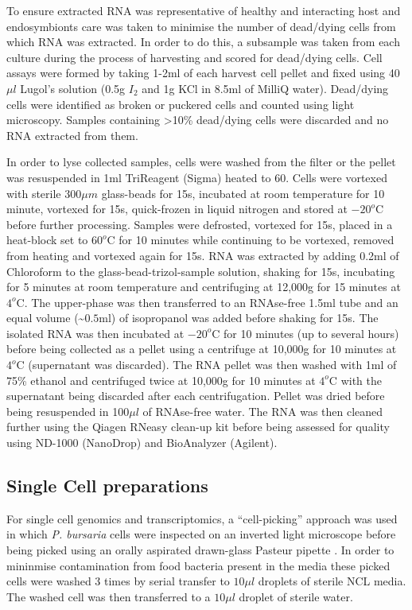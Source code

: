 To ensure extracted RNA was representative of healthy and interacting host 
and endosymbionts care was taken to minimise the number of dead/dying cells 
from which RNA was extracted.  In order to do this, a subsample was taken 
from each culture during the process of harvesting and scored for dead/dying cells.  
Cell assays were formed by taking 1-2ml of each harvest cell pellet and 
fixed using 40\(\mu l\) Lugol's solution (0.5g \(I_{2}\) and 1g KCl in 8.5ml 
of MilliQ water). Dead/dying cells were identified as broken or puckered cells 
and counted using light microscopy.  Samples containing >10\% dead/dying cells 
were discarded and no RNA extracted from them.

In order to lyse collected samples, cells were washed from the filter or the 
pellet was resuspended in 1ml TriReagent (Sigma) heated to \(60\)\celsius. 
Cells were vortexed with sterile 300$\mu m$ glass-beads for 15s, incubated at 
room temperature for 10 minute, vortexed for 15s, quick-frozen in liquid 
nitrogen and stored at $-20^{o}$C before further processing.  
Samples were defrosted, vortexed for 15s, placed in a heat-block set 
to $60^{o}$C for 10 minutes while continuing to be vortexed, removed from 
heating and vortexed again for 15s.  
RNA was extracted by adding 0.2ml of Chloroform to the glass-bead-trizol-sample 
solution, shaking for 15s, incubating for 5 minutes at room temperature and 
centrifuging at 12,000g for 15 minutes at $4^{o}$C.  
The upper-phase was then transferred to an RNAse-free 1.5ml tube and an 
equal volume (\textasciitilde$0.5$ml) of isopropanol was added before shaking for 15s.  
The isolated RNA was then incubated at $-20^{o}$C for 10 minutes 
(up to several hours) before being collected as a pellet using a centrifuge at 
10,000g for 10 minutes at $4^{o}$C (supernatant was discarded). 
The RNA pellet was then washed with 1ml of 75\% ethanol and centrifuged 
twice at 10,000g for 10 minutes at $4^{o}$C with the supernatant being 
discarded after each centrifugation.  
Pellet was dried before being resuspended in 100$\mu l$ of RNAse-free water.  
The RNA was then cleaned further using the Qiagen RNeasy clean-up kit 
before being assessed for quality using ND-1000 (NanoDrop) and BioAnalyzer (Agilent).


\subsection{Single Cell preparations}

For single cell genomics and transcriptomics, a ``cell-picking'' approach was used in which
\textit{P. bursaria} cells were inspected on an inverted light microscope before being picked
using an orally aspirated drawn-glass Pasteur pipette \citep{Garcia-Cuetos2012}.
In order to mininmise contamination from food bacteria present in the media these picked cells
were washed 3 times by serial transfer to \(10\mu l\) droplets of sterile NCL media.
The washed cell was then transferred to a \(10\mu l\) droplet of sterile water.

